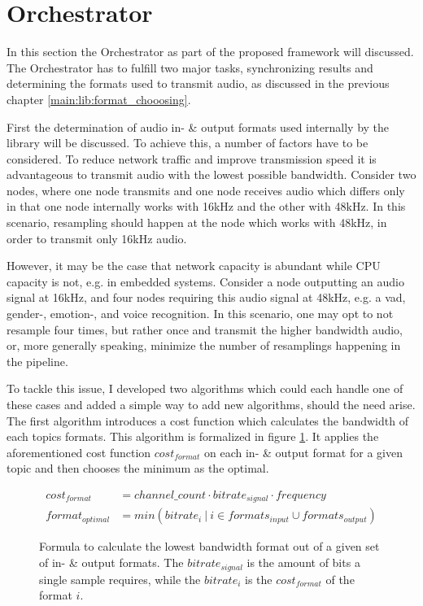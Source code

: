 


\section{Orchestrator}
\label{main:orc}
In this section the Orchestrator as part of the proposed framework will discussed.
The Orchestrator has to fulfill two major tasks, synchronizing results and determining the formats used to transmit audio, as discussed in the previous chapter \ref{main:lib:format_chooosing}.

First the determination of audio in- \& output formats used internally by the library will be discussed.
To achieve this, a number of factors have to be considered.
To reduce network traffic and improve transmission speed it is advantageous to transmit audio with the lowest possible bandwidth.
Consider two nodes, where one node transmits and one node receives audio which differs only in that one node internally works with 16kHz and the other with 48kHz.
In this scenario, resampling should happen at the node which works with 48kHz, in order to transmit only 16kHz audio.

However, it may be the case that network capacity is abundant while CPU capacity is not, e.g. in embedded systems.
Consider a node outputting an audio signal at 16kHz, and four nodes requiring this audio signal at 48kHz, e.g. a \gls{vad}, gender-, emotion-, and voice recognition.
In this scenario, one may opt to not resample four times, but rather once and transmit the higher bandwidth audio, or, more generally speaking, minimize the number of resamplings happening in the pipeline.

To tackle this issue, I developed two algorithms which could each handle one of these cases and added a simple way to add new algorithms, should the need arise.
The first algorithm introduces a cost function which calculates the bandwidth of each topics formats.
This algorithm is formalized in figure \ref{main:orc:resampling:formula:min_traffic}.
It applies the aforementioned cost function $cost_{format}$ on each in- \& output format for a given topic and then chooses the minimum as the optimal.

\begin{figure}
	\begin{align}
	cost_{format} &= channel\_count \cdot bitrate_{signal} \cdot frequency\\
	format_{optimal} &= min({bitrate_{i}\ |\ i \in formats_{input} \cup formats_{output}})
	\end{align}
	\caption{Formula to calculate the lowest bandwidth format out of a given set of in- \& output formats.
		The $bitrate_{signal}$ is the amount of bits a single sample requires, while the $bitrate_{i}$ is the $cost_{format}$ of the format $i$.}
	\label{main:orc:resampling:formula:min_traffic}
\end{figure}

